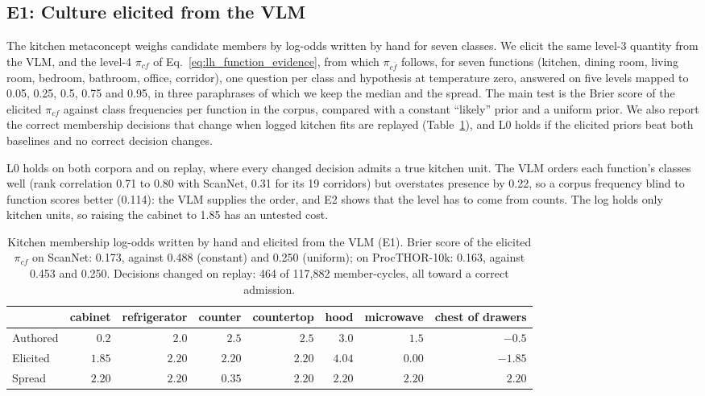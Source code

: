\subsection{E1: Culture elicited from the VLM}
\label{sec:experiments:e1}

The kitchen metaconcept weighs candidate members by log-odds written by hand for seven classes. We elicit the same
level-3 quantity from the VLM, and the level-4 $\pi_{cf}$ of Eq.~\eqref{eq:lh_function_evidence}, from which $\pi_{c\bar f}$ follows,
for seven functions (kitchen, dining room, living room, bedroom, bathroom, office, corridor), one question per class
and hypothesis at temperature zero, answered on five levels mapped to 0.05, 0.25, 0.5, 0.75 and 0.95, in three
paraphrases of which we keep the median and the spread. The main test is the Brier score of the elicited $\pi_{cf}$
against class frequencies per function in the corpus, compared with a constant ``likely'' prior and a uniform prior.
We also report the correct membership decisions that change when logged kitchen fits are replayed
(Table~\ref{tab:exp_e1}), and L0 holds if the elicited priors beat both baselines and no correct decision changes.

L0 holds on both corpora and on replay, where every changed decision admits a true kitchen unit. The VLM orders each
function's classes well (rank correlation 0.71 to 0.80 with ScanNet, 0.31 for its 19 corridors) but overstates
presence by 0.22, so a corpus frequency blind to function scores better (0.114): the VLM supplies the order, and E2 shows
that the level has to come from counts. The log holds only kitchen units, so raising the cabinet
to 1.85 has an untested cost.

\begin{table}[!htb]
    \centering
    \small
    \begin{tabular}{|l|r|r|r|r|r|r|r|}
        \hline
        & cabinet & refrigerator & counter & countertop & hood & microwave & chest of drawers \\ \hline
        Authored & $0.2$ & $2.0$ & $2.5$ & $2.5$ & $3.0$ & $1.5$ & $-0.5$ \\ \hline
        Elicited & $1.85$ & $2.20$ & $2.20$ & $2.20$ & $4.04$ & $0.00$ & $-1.85$ \\ \hline
        Spread   & $2.20$ & $2.20$ & $0.35$ & $2.20$ & $2.20$ & $2.20$ & $2.20$ \\ \hline
    \end{tabular}
    \caption{Kitchen membership log-odds written by hand and elicited from the VLM (E1).
    Brier score of the elicited $\pi_{cf}$ on ScanNet: 0.173, against 0.488 (constant) and 0.250
    (uniform); on ProcTHOR-10k: 0.163, against 0.453 and 0.250. Decisions changed on replay: 464 of 117{,}882
    member-cycles, all toward a correct admission.}
    \label{tab:exp_e1}
\end{table}

